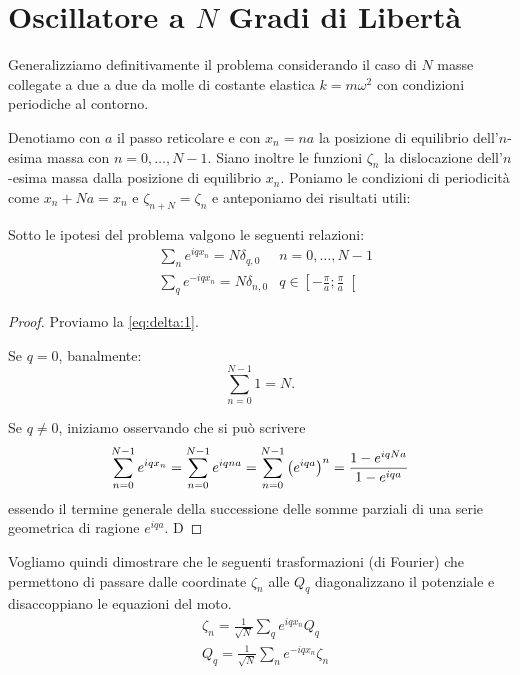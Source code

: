 \section{Oscillatore a $N$ Gradi di Libert\`a}
    Generalizziamo definitivamente il problema considerando il caso di $N$ masse collegate a due a due da molle di costante elastica $k=m\omega^2$ con condizioni periodiche al contorno. \par Denotiamo con $a$ il passo reticolare e con $x_n=na$ la posizione di equilibrio dell'$n$-esima massa con $n=0,\dots,N-1$. Siano inoltre le funzioni $\zeta_n$ la dislocazione dell'$n$-esima massa dalla posizione di equilibrio $x_n$. Poniamo le condizioni di periodicit\`a come $x_n+Na=x_n$ e $\zeta_{n+N}=\zeta_n$ e anteponiamo dei risultati utili:
    \begin{lemma}
        Sotto le ipotesi del problema valgono le seguenti relazioni:
        \begin{align}
            &\sum_{n}e^{iqx_n}=N\delta_{q,0} &n=0,\dots,N-1 \label{eq:delta:1}\\
            &\sum_{q}e^{-iqx_n}=N\delta_{n,0} &q\in\left[-\frac{\pi}{a};\frac{\pi}{a}\right[ \label{eq:delta:2}
        \end{align}
    \end{lemma}
    \begin{proof}
        Proviamo la \eqref{eq:delta:1}. \par Se $q=0$, banalmente: $$\sum_{n=0}^{N-1}1=N.$$ \par Se $q\neq0$, iniziamo osservando che si pu\`o scrivere $$\sum_{n=0}^{N-1} e^{iqx_n}=\sum_{n=0}^{N-1} e^{iqna}=\sum_{n=0}^{N-1}\qty(e^{iqa})^n=\frac{1-e^{iqNa}}{1-e^{iqa}}$$ essendo il termine generale della successione delle somme parziali di una serie geometrica di ragione $e^{iqa}$. D
    \end{proof}
    
    
    Vogliamo quindi dimostrare che le seguenti trasformazioni (di Fourier) che permettono di passare dalle coordinate $\zeta_n$ alle $Q_q$ diagonalizzano il potenziale e disaccoppiano le equazioni del moto.
    \begin{align}
        &\zeta_n=\frac{1}{\sqrt{N}}\sum_q e^{iqx_n}Q_q \label{eq:cambio:1}\\
        &Q_q=\frac{1}{\sqrt{N}}\sum_n e^{-iqx_n}\zeta_n \label{eq:cambio:2}
    \end{align} \par
    